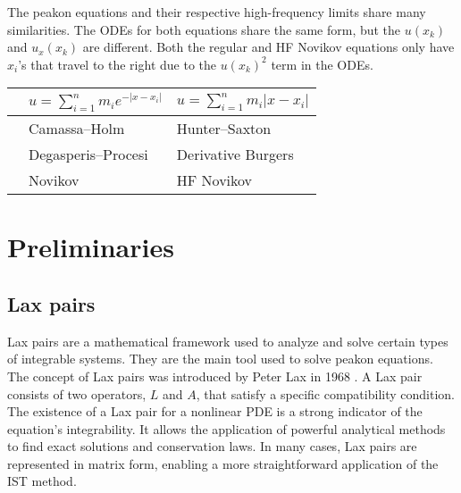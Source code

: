 \documentclass[english,master]{liumaiex}
\theoremstyle{plain}
\theoremstyle{definition}
\begin{document}
The peakon equations and their respective high-frequency limits share many similarities. The ODEs for both equations share the same form, but the $u(x_k)$ and $u_x(x_k)$ are different. Both the regular and HF Novikov equations only have $x_i$'s that travel to the right due to the $u(x_k)^2$ term in the ODEs.
\begin{center}
  \begin{tabular}{l|c|c}
    & $u=\sum_{i=1}^n m_i e^{-|x-x_i|}$ & $u=\sum_{i=1}^n m_i |x-x_i|$ \\[3pt]
    \hline
    \makecell[l]{
	$\begin{aligned}
		\dot{x}_i &= u(x_k),\\
		\dot{m}_i &= -\phantom{2}m_i u_x(m_i)
	\end{aligned}$}
	& \multicolumn{1}{l|}{Camassa--Holm} & \multicolumn{1}{l}{Hunter--Saxton} \\
    \hline
    \makecell[l]{
	$\begin{aligned}
		\dot{x}_i &= u(x_k),\\
		\dot{m}_i &= -2m_i u_x(m_i)
	\end{aligned}$}
	& \multicolumn{1}{l|}{Degasperis--Procesi} & \multicolumn{1}{l}{Derivative Burgers} \\
    \hline
    \makecell[l]{
	$\begin{aligned}
		\dot{x}_i &= u(x_k)^2,\\
		\dot{m}_i &= -\phantom{2}m_i u_x(m_i) u(x_i)
	\end{aligned}$}
	& \multicolumn{1}{l|}{Novikov} & \multicolumn{1}{l}{HF Novikov} \\
  \end{tabular}
\end{center}


\section{Preliminaries}

\subsection{Lax pairs}

Lax pairs are a mathematical framework used to analyze and solve certain types of integrable systems. They are the main tool used to solve peakon equations. The concept of Lax pairs was introduced by Peter Lax in 1968 \cite{Lax_1968}. A Lax pair consists of two operators, $L$ and $A$, that satisfy a specific compatibility condition. The existence of a Lax pair for a nonlinear PDE is a strong indicator of the equation's integrability. It allows the application of powerful analytical methods to find exact solutions and conservation laws. In many cases, Lax pairs are represented in matrix form, enabling a more straightforward application of the IST method.
\end{document}
